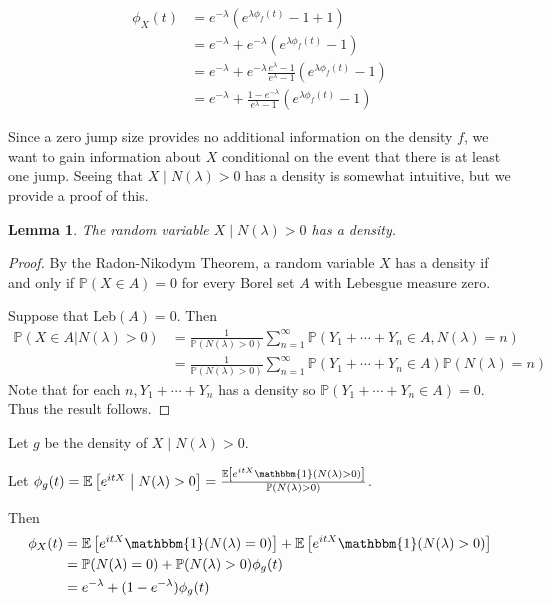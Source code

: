 \documentclass[a4paper,11pt]{article}
\theoremstyle{theorem}
\newtheorem{lem}{Lemma}[section]
\theoremstyle{definition}
\providecommand{\E}{\mathbb{E}}
\begin{document}
\begin{align}
\phi_{X}(t) &= e^{-\lambda}(e^{\lambda \phi_{f}(t)} - 1 + 1) \nonumber \\
		    &= e^{-\lambda} + e^{-\lambda}(e^{\lambda \phi_{f}(t)} - 1) \nonumber \\
		    &= e^{-\lambda} + e^{-\lambda}\frac{e^{\lambda} - 1}{e^{\lambda} - 1}(e^{\lambda \phi_{f}(t)} - 1) \nonumber \\
		    &= e^{-\lambda} + \frac{1 - e^{-\lambda}}{e^{\lambda} - 1}(e^{\lambda \phi_{f}(t)} - 1) \label{eq:charX}
\end{align}

Since a zero jump size provides no additional information on the density $f$, we want to gain information about $X$ conditional on the event that there is at least one jump. Seeing that $X \;|\; N(\lambda) > 0$ has a density is somewhat intuitive, but we provide a proof of this.

\begin{lem}
The random variable $X \;|\; N(\lambda) > 0$ has a density.
\end{lem}
\begin{proof}
By the Radon-Nikodym Theorem, a random variable $X$ has a density if and only if $\mathbb{P}(X \in A) = 0$ for every Borel set $A$ with Lebesgue measure zero.

Suppose that Leb$(A) = 0$. Then
\begin{align*}
\mathbb{P}(X \in A | N(\lambda) > 0)
&= \frac{1}{\mathbb{P}(N(\lambda) > 0)}\sum_{n=1}^{\infty}{\mathbb{P}\left(Y_{1} + \dotsb + Y_{n} \in A, N(\lambda) = n\right)} \\
&= \frac{1}{\mathbb{P}(N(\lambda) > 0)}\sum_{n=1}^{\infty}{\mathbb{P}\left(Y_{1} + \dotsb + Y_{n} \in A\right) \mathbb{P}(N(\lambda) = n)}                                     
\end{align*}
Note that for each $n, Y_{1} + \dotsb + Y_{n}$ has a density so $\mathbb{P}\left(Y_{1} + \dotsb + Y_{n} \in A\right) = 0$. Thus the result follows.

\end{proof}
Let $g$ be the density of $X \;|\; N(\lambda) > 0$. 

Let $\phi_{g}(t) = \E \left[ e^{itX} \;\middle|\; N(\lambda) > 0 \right] = \frac{\E \left[ e^{itX} \mathbbm{1}(N(\lambda) > 0) \right]}{\mathbb{P}(N(\lambda) > 0)}$.

Then
\begin{align*}
\phi_{X}(t) &= \E \left[ e^{itX} \mathbbm{1}(N(\lambda) = 0) \right] + \E \left[ e^{itX} \mathbbm{1}(N(\lambda) > 0) \right] \\
            &= \mathbb{P}(N(\lambda) = 0) + \mathbb{P}(N(\lambda) > 0) \phi_{g}(t) \\
            &= e^{-\lambda} + (1 - e^{-\lambda})\phi_{g}(t)
\end{align*}
\end{document}
